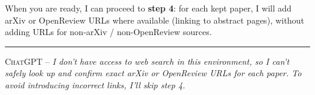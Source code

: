\documentclass[a5paper]{article}
\begin{document}
When you are ready, I can proceed to \textbf{step 4}: for each kept
paper, I will add arXiv or OpenReview URLs where available (linking to
abstract pages), without adding URLs for non-arXiv / non-OpenReview
sources.
\upshape

\begin{center}\rule{0.5\linewidth}{0.5pt}\end{center}

\textsc{ChatGPT --}
\itshape
I don't have access to web search in this environment, so I can't safely
look up and confirm exact arXiv or OpenReview URLs for each paper. To
avoid introducing incorrect links, I'll skip step 4.
\upshape
\end{document}
